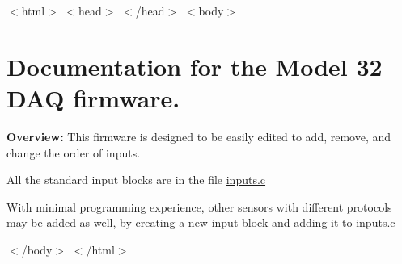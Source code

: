 $<$html$>$ $<$head$>$ $<$/head$>$ $<$body$>$ \hypertarget{md_README_mainpage}{}\section{Documentation for the Model 32 D\-A\-Q firmware. }\label{md_README_mainpage}
{\bfseries Overview\-:} This firmware is designed to be easily edited to add, remove, and change the order of inputs.\par
All the standard input blocks are in the file \hyperlink{inputs_8c}{inputs.\-c} \par
With minimal programming experience, other sensors with different protocols may be added as well, by creating a new input block and adding it to \hyperlink{inputs_8c}{inputs.\-c} \par
   $<$/body$>$ $<$/html$>$ 